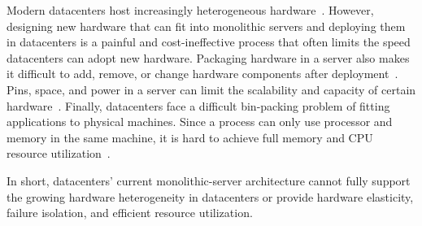 \documentclass[10pt,times,twocolumn]{z2-article}
\begin{document}
Modern datacenters host increasingly heterogeneous hardware~\cite{sigarch-dc,Putnam14-FPGA,TPU,DPU}.
However, designing new hardware that can fit into monolithic servers and deploying them in datacenters
is a painful and cost-ineffective process 
that often limits the speed datacenters can adopt new hardware.
%
Packaging hardware in a server also makes it difficult to add, remove, or change 
hardware components after deployment~\cite{FB-Wedge100}. 
Pins, space, and power in a server can limit the scalability and capacity of certain hardware~\cite{HP-MemoryEvol,ITRS14,MemoryWall95}.
%
Finally, 
datacenters face a difficult bin-packing problem of fitting applications to physical machines.
Since a process can only use processor and memory in the same machine, 
it is hard to achieve full memory and CPU resource utilization~\cite{Barroso-COMPUTER,Quasar-ASPLOS,PowerNap}.


In short, datacenters' current monolithic-server architecture 
cannot fully support the growing hardware heterogeneity in datacenters
or provide hardware elasticity, failure isolation, and efficient resource utilization.
\end{document}
